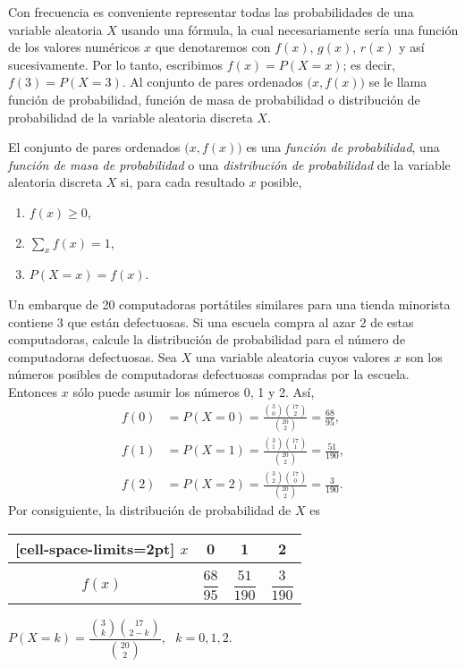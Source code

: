 Con frecuencia es conveniente representar todas las probabilidades de una variable aleatoria $X$ usando una fórmula, la cual necesariamente sería una función de los valores numéricos $x$ que denotaremos con $f(x)$, $g(x)$, $r(x)$ y así sucesivamente. Por lo tanto, escribimos $f(x) = P(X = x)$; es decir, $f(3) = P(X = 3)$. Al conjunto de pares ordenados $\big(x, f(x)\big)$ se le llama función de probabilidad, función de masa de probabilidad o distribución de probabilidad de la variable aleatoria discreta $X$.

\begin{definicion}{}{}
    El conjunto de pares ordenados $\big(x, f(x)\big)$ es una \emph{función de probabilidad}, una \emph{función de masa de probabilidad} o una \emph{distribución de probabilidad} de la variable aleatoria discreta $X$ si, para cada resultado $x$ posible,
    \begin{enumerate}[label=\roman*), topsep=6pt, itemsep=0pt]
        \item $f(x) \geq 0$,
        \item $\displaystyle \sum_x f(x) = 1$,
        \item $P(X = x) = f(x)$.
    \end{enumerate}
\end{definicion}

\begin{examplebox}{}{}
    Un embarque de 20 computadoras portátiles similares para una tienda minorista contiene 3 que están defectuosas. Si una escuela compra al azar 2 de estas computadoras, calcule la distribución de probabilidad para el número de computadoras defectuosas.
    \tcblower
    \solucion Sea $X$ una variable aleatoria cuyos valores $x$ son los números posibles de computadoras defectuosas compradas por la escuela. Entonces $x$ sólo puede asumir los números 0, 1 y 2. Así,
    \begin{align*}
        f(0) & = P(X = 0) = \frac{\binom{3}{0} \binom{17}{2}}{\binom{20}{2}} = \frac{68}{95}, \\
        f(1) & = P(X = 1) = \frac{\binom{3}{1} \binom{17}{1}}{\binom{20}{2}} = \frac{51}{190}, \\
        f(2) & = P(X = 2) = \frac{\binom{3}{2} \binom{17}{0}}{\binom{20}{2}} = \frac{3}{190}.
    \end{align*}
    Por consiguiente, la distribución de probabilidad de $X$ es
    \begin{center}
        \begin{NiceTabular}{c|ccc}[cell-space-limits=2pt]
            $x$ & 0 & 1 & 2 \\
            \hline \\[-3.5mm]
            $f(x)$ & $\dfrac{68}{95}$ & $\dfrac{51}{190}$ & $\dfrac{3}{190}$
        \end{NiceTabular} \qquad $P(X = k) = \dfrac{\binom{3}{k} \binom{17}{2-k}}{\binom{20}{2}}$,~ $k = 0, 1, 2$.
    \end{center}
\end{examplebox}

